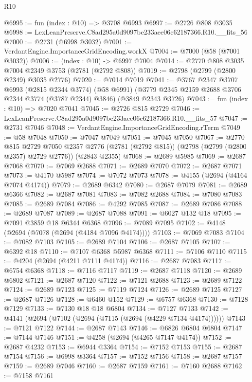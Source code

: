 \begin{lexlean}{R10}
\begin{coremodule}
@6995 := fun (index : @10) => @3708 @6993
@6997 := @2726 @808 @3035
@6998 := LexLeanPreserve.C8ad295a0d9097be233aee06c62187366.R10.__fits_56
@7000 := @2731 (@6998 @3032)
@7001 := VerdantEngine.ImportanceGridEncoding.workX
@7004 := @7000 (@58 (@7001 @3032))
@7006 := (index : @10) -> @6997 @7004
@7014 := @2770 @808 @3035 @7004 @2349 @3753 (@2781 (@2792 @808))
@7019 := @2798 (@2799 (@2800 @2349) @3035 @2776)
@7020 := @7014 @7019
@7041 := @3767
    @2347
    @3707
    @6993
    (@2815 @2344 @3774)
    (@58 @6991)
    (@3779 @2345 @2159 @2688 @3706 @2344 @3774 (@3787 @2344) @3846)
    (@3849 @2343 @3726)
@7043 := fun (index : @10) => @7020 @7041
@7045 := @2726 @815 @2729
@7046 := LexLeanPreserve.C8ad295a0d9097be233aee06c62187366.R10.__fits_57
@7047 := @2731 @7046
@7048 := VerdantEngine.ImportanceGridEncoding.rTerm
@7049 := @58 @7048
@7050 := @7047 @7049
@7051 := @7045 @7050
@7067 := @2770
    @815
    @2729
    @7050
    @2357
    @2776
    (@2781 (@2792 @815))
    (@2798 (@2799 (@2800 @2357) @2729 @2776))
    (@2843 @2355)
@7068 := @2689 @5985
@7069 := @2687 @7068
@7070 := @7069 @2688
@7071 := @2689 @7070
@7072 := @2687 @7071
@7073 := @4170 @5987
@7074 := @7072 @7073
@7078 := @4155 (@2694 (@4164 @7074 @4174))
@7079 := @2689 @6342
@7080 := @2687 @7079
@7081 := @2689 @6366
@7082 := @2687 @7081
@7083 := @7082 @2688
@7084 := @7080 @7083
@7085 := @2689 @7084
@7086 := @4292 @7085
@7087 := @2689 @7086
@7088 := @2689 @7087
@7089 := @2687 @7088
@7091 := @6027 @132 @18
@7095 := @7091 @3859 @18 @6344 @6368
@7096 := @7089 @7095
@7102 := @4148 (@2694 (@7078 (@2694 (@4184 @7096 @4174))))
@7103 := @7069 @7083
@7104 := @7082 @7103
@7105 := @2689 @7104
@7106 := @2687 @7105
@7107 := @6392 @18
@7110 := @7107 @6368 @5987 @6368
@7111 := @7106 @7110
@7115 := @4204 (@2694 (@4211 @7111 @4174))
@7116 := @2687 @7083
@7117 := @6754 @6368
@7118 := @7116 @7117
@7119 := @2687 @7118
@7120 := @2689 @6802
@7121 := @2687 @7120
@7122 := @7121 @2688
@7123 := @2689 @7122
@7124 := @2689 @7123
@7125 := @7119 @7124
@7126 := @2689 @7125
@7127 := @2687 @7126
@7128 := @6460 @152
@7129 := @6757 @6368
@7130 := @7128 @7129
@7133 := @7130 @18 @18 @6804
@7134 := @7127 @7133
@7142 := @4141 (@2694 (@7102 (@2694 (@7115 (@2694 (@4229 @7134 @4174))))))
@7143 := @7121 @7122
@7144 := @2687 @7143
@7146 := @6826 @6804 @6804
@7147 := @7144 @7146
@7151 := @4258 (@2694 (@4265 @7147 @4174))
@7152 := @2687 @4232
@7153 := @6944 @3364
@7154 := @7152 @7153
@7155 := @2687 @7154
@7156 := @6998 @3364
@7157 := @7152 @7156
@7158 := @2687 @7157
@7159 := @2689 @7046
@7160 := @2687 @7159
@7161 := @7160 @2688
@7162 := @7158 @7161

\end{coremodule}
\end{lexlean}

